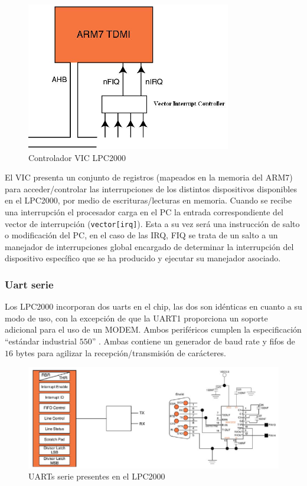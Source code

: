 \documentclass[10pt,a4paper]{article}
\begin{document}
	
	\begin{figure}[htbp]
	\begin{center}
	\includegraphics[width = 0.3\columnwidth]{img/lpcvic}
	\end{center}
	
	\caption{Controlador VIC LPC2000}
	\label{fig:lpcvic}
	\end{figure}
	
	El VIC presenta un conjunto de registros (mapeados en la memoria del ARM7) para acceder/controlar las interrupciones de los distintos dispositivos disponibles en el LPC2000, por medio de escrituras/lecturas en memoria.
	Cuando se recibe una interrupción el procesador carga en el PC la entrada correspondiente del vector de interrupción (\texttt{vector[irq]}).  Esta a su vez será una instrucción de salto o modificación del PC, en el caso de las IRQ, FIQ se trata de un salto a un manejador de interrupciones global encargado de determinar la interrupción del dispositivo específico que se ha producido y ejecutar su manejador asociado.
		
	\subsubsection{Uart serie}
		
	Los LPC2000 incorporan dos uarts en el chip, las dos son idénticas en cuanto a su modo de uso, con la excepción de que la UART1 proporciona un soporte adicional para el uso de un MODEM. Ambos periféricos cumplen la especificación ``estándar industrial $550$'' \cite{UART}. Ambas contiene un generador de baud rate y fifos de $16$ bytes para agilizar la recepción/transmisión de carácteres.
	
	\begin{figure}[htbp]
	\begin{center}
	\includegraphics[width = 0.5\columnwidth]{img/lpcuart}
	\end{center}
	
	\caption{UARTs serie presentes en el LPC2000}
	\label{fig:lpcuart}
	\end{figure}
		
\end{document}
